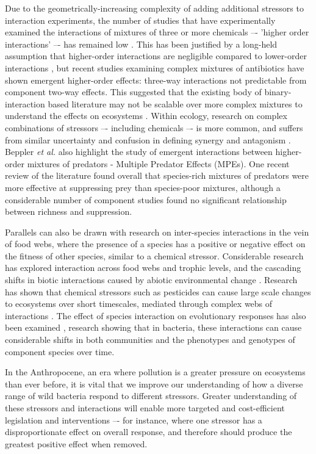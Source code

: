 \documentclass[10pt]{article}
\begin{document}
Due to the geometrically-increasing complexity of adding additional stressors to interaction experiments, the number of studies that have experimentally examined the interactions of mixtures of three or more chemicals –- 'higher order interactions' –- has remained low \cite{Beppler2016}. This has been justified by a long-held assumption that higher-order interactions are negligible compared to lower-order interactions \cite{Tekin2017a}, but recent studies examining complex mixtures of antibiotics have shown emergent higher-order effects: three-way interactions not predictable from component two-way effects. This suggested that the existing body of binary-interaction based literature may not be scalable over more complex mixtures to understand the effects on ecosystems \cite{Tekin2016, Zimmer2016, Tekin2017}. Within ecology, research on complex combinations of stressors –- including chemicals –- is more common, and suffers from similar uncertainty and confusion in defining synergy and antagonism \cite{Cote2016}.  Beppler \textit{et al.} also highlight the study of emergent interactions between higher-order mixtures of predators - Multiple Predator Effects (MPEs). One recent review of the literature \cite{Griffin2013EffectsMeta-analysis} found overall that species-rich mixtures of predators were more effective at suppressing prey than species-poor mixtures, although a considerable number of component studies found no significant relationship between richness and suppression. 

Parallels can also be drawn with research on inter-species interactions in the vein of food webs, where the presence of a species has a positive or negative effect on the fitness of other species, similar to a chemical stressor. Considerable research has explored interaction across food webs and trophic levels, and the  cascading shifts in biotic interactions caused by abiotic environmental change \cite{Hooper2005,Parmesan2006,Chesson2000}. Research has shown that chemical stressors such as pesticides can cause large scale changes to ecosystems over short timescales, mediated through complex webs of interactions \cite{Thompson2016}. The effect of species interaction on evolutionary responses has also been examined \cite{Lawrence2012}, research showing that in bacteria, these interactions can cause considerable shifts in both communities and the phenotypes and genotypes of component species over time.

In the Anthropocene, an era where pollution is a greater pressure on ecosystems than ever before, it is vital that we improve our understanding of how a diverse range of wild bacteria respond to different stressors. Greater understanding of these stressors and interactions will enable more targeted and cost-efficient legislation and interventions –- for instance, where one stressor has a disproportionate effect on overall response, and therefore should produce the greatest positive effect when removed. 
\end{document}
